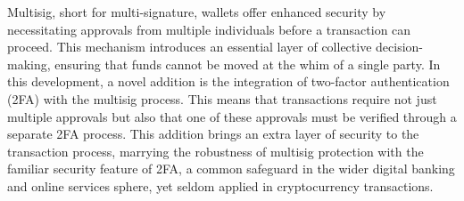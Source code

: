 \documentclass[12pt]{report}
\begin{document}
\par Multisig, short for multi-signature, wallets offer enhanced security by necessitating approvals from multiple individuals before a transaction can proceed. This mechanism introduces an essential layer of collective decision-making, ensuring that funds cannot be moved at the whim of a single party. In this development, a novel addition is the integration of two-factor authentication (2FA) with the multisig process. This means that transactions require not just multiple approvals but also that one of these approvals must be verified through a separate 2FA process. This addition brings an extra layer of security to the transaction process, marrying the robustness of multisig protection with the familiar security feature of 2FA, a common safeguard in the wider digital banking and online services sphere, yet seldom applied in cryptocurrency transactions.

















\tableofcontents


\newpage
{}










\end{document}
